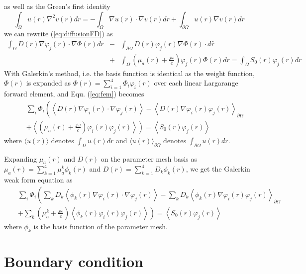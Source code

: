 \documentclass[12pt]{book}               %
\begin{document}
as well as the Green's first identity
\begin{equation}
\label{eq:Green1} \int_{\Omega}{u(r)\nabla^2
v(r)dr}=-\int_{\Omega}{\nabla u(r)\cdot\nabla
v(r)dr}+\int_{\partial\Omega} {u(r)\nabla v(r)dr}
\end{equation}
we can rewrite (\ref{eq:diffusionFD}) as
\begin{eqnarray}
\label{eq:fem}
\int_{\Omega}{D(r)\nabla\varphi_j(r)\cdot\nabla\Phi(r)dr}&-&\int_{\partial\Omega}{D(r)\varphi_j(r)\nabla\Phi(r)\cdot
d\hat{r}}\\\nonumber &+&\int_{\Omega}
{\left(\mu_a(r)+\frac{j\omega}{c}\right)\varphi_j(r)\Phi(r)dr}=\int_{\Omega}
{S_0(r)\varphi_j(r)dr}
\end{eqnarray}
With Galerkin's method, i.e. the basis function is identical as
the weight function, $\Phi(r)$ is expanded as
$\Phi(r)=\sum_{i=1}^{4}\Phi_i\varphi_i(r)$ over each linear
Largarange forward element, and Equ. (\ref{eq:fem}) becomes
\begin{eqnarray}
\label{eq:galerkin}\nonumber&&\sum_{i}\Phi_i\left(\left\langle
D(r)\nabla\varphi_i(r)\cdot\nabla\varphi_j(r)\right\rangle -
\left\langle
D(r)\nabla\varphi_i(r)\varphi_j(r)\right\rangle_{\partial\Omega}\right.
\\&&+ \left.\left\langle
\left(\mu_a(r)+
\frac{j\omega}{c}\right)\varphi_i(r)\varphi_j(r)\right\rangle\right)=\left\langle
S_0(r)\varphi_j(r)\right\rangle
\end{eqnarray}
where $\langle u(r)\rangle$ denotes $\int_{\Omega}u(r)dr$ and
$\langle u(r)\rangle_{\partial\Omega}$ denotes
$\int_{\partial\Omega}u(r) dr$.

Expanding $\mu_a(r)$ and $D(r)$ on the parameter mesh basis as
$\mu_a(r)=\sum_{k=1}^{4}\mu_a^k\phi_k(r)$ and
$D(r)=\sum_{k=1}^{4}D_k\phi_k(r)$, we get the Galerkin weak form
equation as
\begin{eqnarray}
\label{eq:weakform}\nonumber&&\sum_{i}\Phi_i\left(\sum_{k}D_k\left\langle
\phi_k(r)\nabla\varphi_i(r)\cdot\nabla\varphi_j(r)\right\rangle -
\sum_{k}D_k\left\langle
\phi_k(r)\nabla\varphi_i(r)\varphi_j(r)\right\rangle_{\partial\Omega}\right.
\\&&\left.+\sum_{k}\left(\mu_{a}^k+\frac{j\omega}{c}\right)\left\langle\phi_k(r)\varphi_i(r)\varphi_j(r)\right\rangle\right)=\left\langle
S_0(r)\varphi_j(r)\right\rangle
\end{eqnarray}
where $\phi_k$ is the basis function of the parameter mesh.

\section{Boundary condition}
\end{document}
